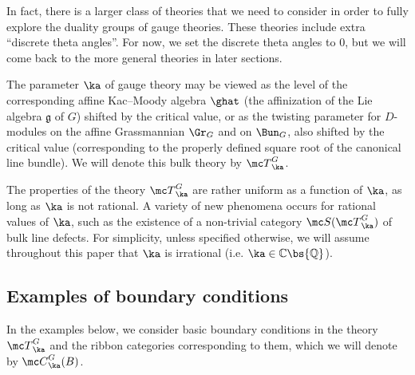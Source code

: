 \documentclass[11pt,reqno]{amsart}
\theoremstyle{plain}
\numberwithin{equation}{section}
\newcommand{\C}{\mathbb{C}}
\newcommand{\g}{\mathfrak{g}}
\theoremstyle{definition}
\begin{document}
In fact, there is a larger class of theories that we need to consider
in order to fully explore the duality groups of gauge theories. These
theories include extra ``discrete theta angles''. For now, we set the
discrete theta angles to $0$, but we will come back to the more
general theories in later sections.

The parameter $\ka$ of gauge theory may be viewed as the level of the
corresponding affine Kac--Moody algebra $\ghat$ (the affinization of
the Lie algebra $\g$ of $G$) shifted by the critical value, or as the
twisting parameter for $D$-modules on the affine Grassmannian $\Gr_G$
and on $\Bun_G$, also shifted by the critical value (corresponding to
the properly defined square root of the canonical line bundle). We
will denote this bulk theory by ${\mc T}^G_\ka$.

The properties of the theory ${\mc T}^G_\ka$ are rather uniform as a
function of $\ka$, as long as $\ka$ is not rational. A variety of new
phenomena occurs for rational values of $\ka$, such as the existence
of a non-trivial category ${\mc S}({\mc T}^G_\ka)$
of bulk line defects. For simplicity, unless specified otherwise, we
will assume throughout this paper that $\ka$ is irrational (i.e. $\ka
\in \C \bs {\mathbb Q}$).

\subsection{Examples of boundary conditions}    \label{ex bc}

In the examples below, we consider basic boundary conditions in the
theory ${\mc T}^G_\ka$ and the ribbon categories corresponding
to them, which we will denote by ${\mc C}^G_\ka(B)$.

\bigskip
\end{document}

